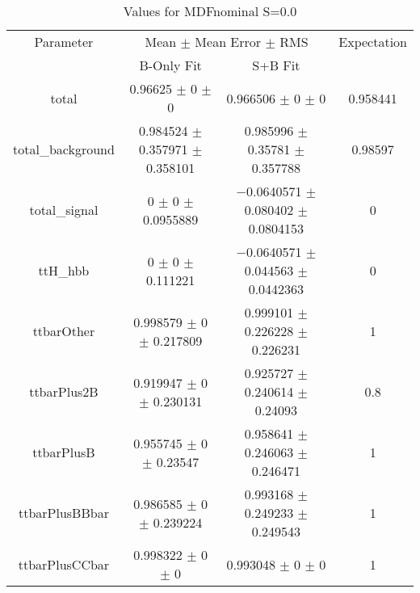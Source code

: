 \begin{table}
\centering
\caption{Values for MDFnominal S=0.0}
\begin{tabular}{cccc}
\toprule
Parameter & \multicolumn{2}{c}{Mean $\pm$ Mean Error $\pm$ RMS} & Expectation\\
 & B-Only Fit & S+B Fit & \\
\midrule
total & \num{0.96625} $\pm$ \num{0} $\pm$ \num{0} & \num{0.966506} $\pm$ \num{0} $\pm$ \num{0} & \num{0.958441}\\
total\_background & \num{0.984524} $\pm$ \num{0.357971} $\pm$ \num{0.358101} & \num{0.985996} $\pm$ \num{0.35781} $\pm$ \num{0.357788} & \num{0.98597}\\
total\_signal & \num{0} $\pm$ \num{0} $\pm$ \num{0.0955889} & \num{-0.0640571} $\pm$ \num{0.080402} $\pm$ \num{0.0804153} & \num{0}\\
ttH\_hbb & \num{0} $\pm$ \num{0} $\pm$ \num{0.111221} & \num{-0.0640571} $\pm$ \num{0.044563} $\pm$ \num{0.0442363} & \num{0}\\
ttbarOther & \num{0.998579} $\pm$ \num{0} $\pm$ \num{0.217809} & \num{0.999101} $\pm$ \num{0.226228} $\pm$ \num{0.226231} & \num{1}\\
ttbarPlus2B & \num{0.919947} $\pm$ \num{0} $\pm$ \num{0.230131} & \num{0.925727} $\pm$ \num{0.240614} $\pm$ \num{0.24093} & \num{0.8}\\
ttbarPlusB & \num{0.955745} $\pm$ \num{0} $\pm$ \num{0.23547} & \num{0.958641} $\pm$ \num{0.246063} $\pm$ \num{0.246471} & \num{1}\\
ttbarPlusBBbar & \num{0.986585} $\pm$ \num{0} $\pm$ \num{0.239224} & \num{0.993168} $\pm$ \num{0.249233} $\pm$ \num{0.249543} & \num{1}\\
ttbarPlusCCbar & \num{0.998322} $\pm$ \num{0} $\pm$ \num{0} & \num{0.993048} $\pm$ \num{0} $\pm$ \num{0} & \num{1}\\
\bottomrule
\end{tabular}
\end{table}